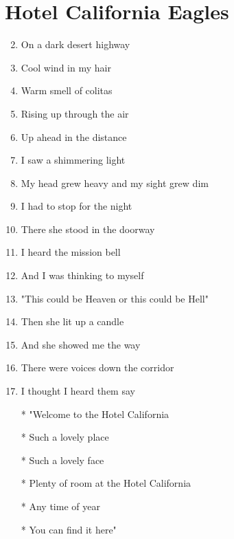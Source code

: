 \documentclass{article}
\begin{document}
    \section*{Hotel California \by Eagles}

    \begin{center}
        \begin{enumerate}

            \item[] 
            \item On a dark desert highway
            \item Cool wind in my hair
            \item Warm smell of colitas
            \item Rising up through the air
            \item Up ahead in the distance
            \item I saw a shimmering light
            \item My head grew heavy and my sight grew dim
            \item I had to stop for the night
            \item There she stood in the doorway
            \item I heard the mission bell
            \item And I was thinking to myself
            \item "This could be Heaven or this could be Hell"
            \item Then she lit up a candle
            \item And she showed me the way
            \item There were voices down the corridor
            \item I thought I heard them say
        
            \item[]
            \item[] \chorus
            \item[*] "Welcome to the Hotel California
            \item[*] Such a lovely place
            \item[*] Such a lovely face
            \item[*] Plenty of room at the Hotel California
            \item[*] Any time of year
            \item[*] You can find it here"


\end{enumerate}
\end{center}
\end{document}
